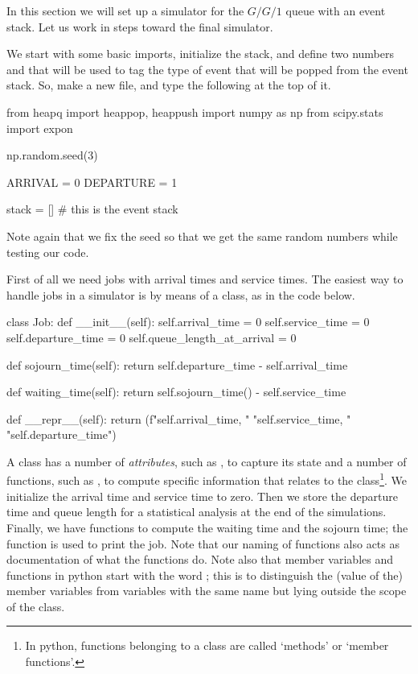 In this section we will set up a simulator for the $G/G/1$ queue with  an event stack. Let us work in steps toward the final simulator.

We start with some basic imports, initialize the stack, and define two numbers  and  that will be used to tag the type of event that will be popped from the event stack.
So, make a new file, and type the following at the top of it.

\begin{pyblock}
from heapq import heappop, heappush
import numpy as np 
from scipy.stats import expon

np.random.seed(3) 

ARRIVAL = 0
DEPARTURE = 1

stack = [] # this is the event stack
\end{pyblock}

Note again that we fix the seed so that we get the same random numbers while testing our code. 


First of all we need jobs with arrival times and service times. The easiest way to handle jobs in a simulator is by means of a class, as in the code below.


\begin{pyblock}
class Job:
    def __init__(self):
        self.arrival_time = 0
        self.service_time = 0
        self.departure_time = 0
        self.queue_length_at_arrival = 0

    def sojourn_time(self):
        return self.departure_time - self.arrival_time

    def waiting_time(self):
        return self.sojourn_time() - self.service_time

    def __repr__(self):
        return (f"{self.arrival_time}, "
                "{self.service_time}, "
                "{self.departure_time}\n")

  
\end{pyblock}

A class has a number of \emph{attributes}, such as , to capture its state and a number of functions, such as , to compute specific information that relates to the class\footnote{In python, functions belonging to a class are called `methods' or `member functions'.}.
We initialize the arrival time and service time to zero.
Then we store the departure time and queue length for a statistical analysis at the end of the simulations.
Finally, we have functions to compute the waiting time and the sojourn time; the  function is used to print the job.
Note that our naming of functions also acts as documentation of what the functions do.
Note also that member variables and functions in python start with the word ; this is to distinguish the (value of the) member variables from variables with the same name but lying outside the scope of the class.


